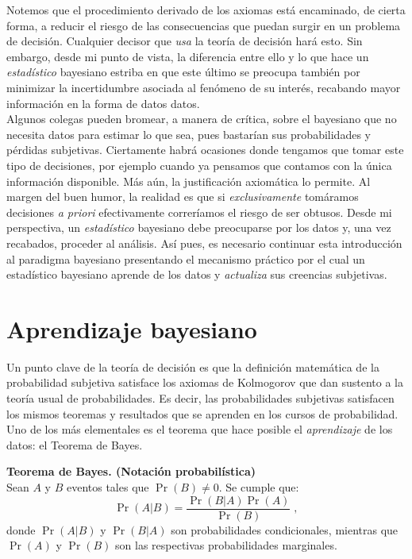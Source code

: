 Notemos que el procedimiento derivado de los axiomas está encaminado, de cierta forma, a reducir el riesgo de las consecuencias que puedan surgir en un problema de decisión. Cualquier decisor que \textit{usa} la teoría de decisión hará esto. Sin embargo, desde mi punto de vista, la diferencia entre ello y lo que hace un \textit{estadístico} bayesiano estriba en que este último se preocupa también por minimizar la incertidumbre asociada al fenómeno de su interés, recabando mayor información en la forma de datos datos.\\ 

Algunos colegas pueden bromear, a manera de crítica, sobre el bayesiano que no necesita datos para estimar lo que sea, pues bastarían sus probabilidades y pérdidas subjetivas. Ciertamente habrá ocasiones donde tengamos que tomar este tipo de decisiones, por ejemplo cuando ya pensamos que contamos con la única información disponible. Más aún, la justificación axiomática lo permite. Al margen del buen humor, la realidad es que si \textit{exclusivamente} tomáramos decisiones \textit{a priori} efectivamente correríamos el riesgo de ser obtusos. Desde mi perspectiva, un \textit{estadístico} bayesiano debe preocuparse por los datos y, una vez recabados, proceder al análisis. Así pues, es necesario continuar esta introducción al paradigma bayesiano presentando el mecanismo práctico por el cual un estadístico bayesiano aprende de los datos y \textit{actualiza} sus creencias subjetivas.
	
\section{Aprendizaje bayesiano}

Un punto clave de la teoría de decisión es que la definición matemática de la probabilidad subjetiva satisface los axiomas de Kolmogorov que dan sustento a la teoría usual de probabilidades. Es decir, las probabilidades subjetivas satisfacen los mismos teoremas y resultados que se aprenden en los cursos de probabilidad. Uno de los más elementales es el teorema que hace posible el \textit{aprendizaje} de los datos: el Teorema de Bayes.

\begin{teo} \label{teo:Bayes_1}
\textbf{Teorema de Bayes. (Notación probabilística)}\\
Sean $A$ y $B$ eventos tales que $\Pr(B) \neq 0$. Se cumple que: 
\begin{equation*}
\Pr(A|B)=\dfrac{\Pr(B|A)\Pr(A)}{\Pr(B)}\;,
\end{equation*}
donde $\Pr(A|B)$ y $\Pr(B|A)$ son probabilidades condicionales, mientras que $\Pr(A)$ y $\Pr(B)$ son las respectivas probabilidades marginales. 
\end{teo}

